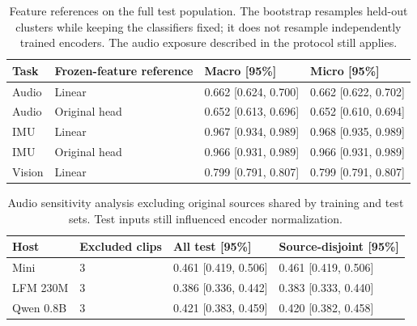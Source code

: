 \begin{table}[!htbp]\centering\small
\setlength{\tabcolsep}{4pt}
\caption{Feature references on the full test population. The bootstrap resamples held-out clusters while keeping the classifiers fixed; it does not resample independently trained encoders. The audio exposure described in the protocol still applies.}\label{tab:linear}
\begin{tabular}{@{}llll@{}}
\toprule
Task & Frozen-feature reference & Macro [95\%] & Micro [95\%] \\
\midrule
Audio & Linear & 0.662 [0.624, 0.700] & 0.662 [0.622, 0.702] \\
Audio & Original head & 0.652 [0.613, 0.696] & 0.652 [0.610, 0.694] \\
IMU & Linear & 0.967 [0.934, 0.989] & 0.968 [0.935, 0.989] \\
IMU & Original head & 0.966 [0.931, 0.989] & 0.966 [0.931, 0.989] \\
Vision & Linear & 0.799 [0.791, 0.807] & 0.799 [0.791, 0.807] \\
\bottomrule
\end{tabular}
\end{table}\par

\begin{table}[!htbp]\centering\small
\setlength{\tabcolsep}{4pt}
\caption{Audio sensitivity analysis excluding original sources shared by training and test sets. Test inputs still influenced encoder normalization.}\label{tab:audio-audit}
\begin{tabular}{@{}llll@{}}
\toprule
Host & Excluded clips & All test [95\%] & Source-disjoint [95\%] \\
\midrule
Mini & 3 & 0.461 [0.419, 0.506] & 0.461 [0.419, 0.506] \\
LFM 230M & 3 & 0.386 [0.336, 0.442] & 0.383 [0.333, 0.440] \\
Qwen 0.8B & 3 & 0.421 [0.383, 0.459] & 0.420 [0.382, 0.458] \\
\bottomrule
\end{tabular}
\end{table}\par

